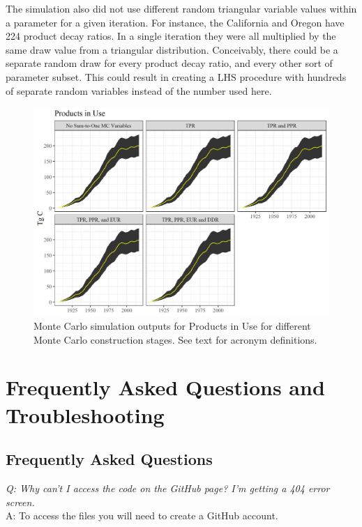 \documentclass[
  openany]{book}
\begin{document}
The simulation also did not use different random triangular variable values within a parameter for a given iteration. For instance, the California and Oregon have 224 product decay ratios. In a single iteration they were all multiplied by the same draw value from a triangular distribution. Conceivably, there could be a separate random draw for every product decay ratio, and every other sort of parameter subset. This could result in creating a LHS procedure with hundreds of separate random variables instead of the number used here.

\begin{figure}
\includegraphics[width=1\linewidth]{images/MC_tests4} \caption{Monte Carlo simulation outputs for Products in Use for different Monte Carlo construction stages.  See text for acronym definitions.}\label{fig:mc-tests4-fig}
\end{figure}

\hypertarget{ft}{%
\chapter{Frequently Asked Questions and Troubleshooting}\label{ft}}

\hypertarget{ft-faqs}{%
\section{Frequently Asked Questions}\label{ft-faqs}}

\emph{Q: Why can't I access the code on the GitHub page? I'm getting a 404 error screen.}\\
A: To access the files you will need to create a GitHub account.
\end{document}
